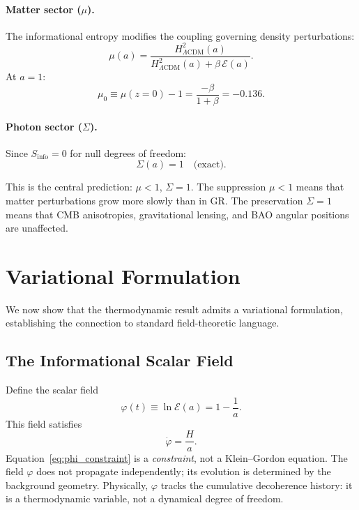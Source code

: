 \documentclass[11pt]{article}
\begin{document}
\paragraph{Matter sector ($\mu$).}
The informational entropy modifies the coupling governing density
perturbations:
\begin{equation}
\mu(a) = \frac{H^2_{\Lambda\mathrm{CDM}}(a)}
  {H^2_{\Lambda\mathrm{CDM}}(a) + \beta\,\mathcal{E}(a)}.
\label{eq:mu_a}
\end{equation}
At $a = 1$:
\begin{equation}
\mu_0 \equiv \mu(z{=}0) - 1
= \frac{-\beta}{1 + \beta} = -0.136.
\label{eq:mu0}
\end{equation}

\paragraph{Photon sector ($\Sigma$).}
Since $S_\mathrm{info} = 0$ for null degrees of freedom:
\begin{equation}
\Sigma(a) = 1 \quad \text{(exact)}.
\label{eq:sigma_1}
\end{equation}

This is the central prediction: $\mu < 1$, $\Sigma = 1$.  The suppression
$\mu < 1$ means that matter perturbations grow more slowly than in GR.  The
preservation $\Sigma = 1$ means that CMB anisotropies, gravitational lensing,
and BAO angular positions are unaffected.


\section{Variational Formulation}
\label{sec:action}

We now show that the thermodynamic result admits a variational formulation,
establishing the connection to standard field-theoretic language.

\subsection{The Informational Scalar Field}

Define the scalar field
\begin{equation}
\varphi(t) \equiv \ln\mathcal{E}(a) = 1 - \frac{1}{a}.
\label{eq:phi_def}
\end{equation}
This field satisfies
\begin{equation}
\dot{\varphi} = \frac{H}{a}.
\label{eq:phi_constraint}
\end{equation}
Equation~\eqref{eq:phi_constraint} is a \emph{constraint}, not a
Klein--Gordon equation.  The field $\varphi$ does not propagate
independently; its evolution is determined by the background geometry.
Physically, $\varphi$ tracks the cumulative decoherence history: it is a
thermodynamic variable, not a dynamical degree of freedom.
\end{document}
